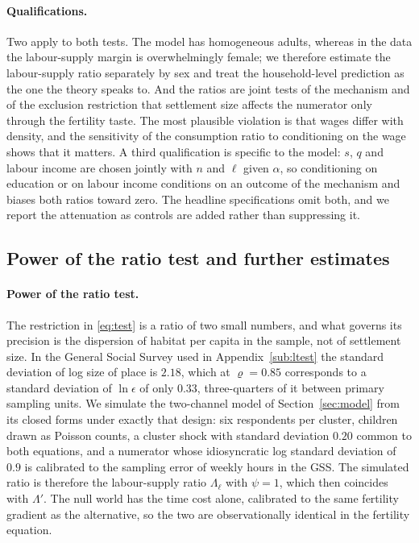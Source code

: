 \documentclass[11pt]{article}
\begin{document}
\paragraph{Qualifications.}
Two apply to both tests. The model has homogeneous adults, whereas in the data the labour-supply
margin is overwhelmingly female; we therefore estimate the labour-supply ratio separately by sex and
treat the household-level prediction as the one the theory speaks to. And the ratios are joint
tests of the mechanism and of the exclusion restriction that settlement size affects the numerator
only through the fertility taste. The most plausible violation is that wages differ with density, and the sensitivity of the
consumption ratio to conditioning on the wage shows that it matters. A third qualification is
specific to the model: $s$, $q$ and labour income are chosen jointly with $n$ and $\ell$ given
$\alpha$, so conditioning on education or on labour income conditions on an outcome of the
mechanism and biases both ratios toward zero. The headline specifications omit both, and we report
the attenuation as controls are added rather than suppressing it.


\subsection{Power of the ratio test and further estimates}
\label{app:power}

\paragraph{Power of the ratio test.}
The restriction in \eqref{eq:test} is a ratio of two small numbers, and what governs its precision
is the dispersion of habitat per capita in the sample, not of settlement size. In the General
Social Survey used in Appendix~\ref{sub:ltest} the standard deviation of log size of place is $2.18$, which at
$\varrho=0.85$ corresponds to a standard deviation of $\ln\epsilon$ of only $0.33$, three-quarters of
it between primary sampling units. We simulate the two-channel model of
Section~\ref{sec:model} from its closed forms under exactly that design: six respondents per
cluster, children drawn as Poisson counts, a cluster shock with standard deviation $0.20$ common to
both equations, and a numerator whose idiosyncratic log standard deviation of $0.9$ is calibrated
to the sampling error of weekly hours in the GSS. The simulated ratio is therefore the labour-supply
ratio $\Lambda_\ell$ with $\psi=1$, which then coincides with $\Lambda'$. The null world has the time cost alone,
calibrated to the same fertility gradient as the alternative, so the two are observationally
identical in the fertility equation.
\end{document}
